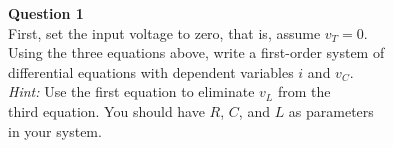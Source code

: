 \documentclass[preview]{standalone}
\begin{document}
\begin{center}
\raggedright
                    \textbf{Question 1} \\[10pt]
                    First, set the input voltage to zero, that is, assume $v_T = 0$. \\
                    Using the three equations above, write a first-order system of \\
                    differential equations with dependent variables $i$ and $v_C$. \\[5pt]
                    \textit{Hint:} Use the first equation to eliminate $v_L$ from the \\
                    third equation. You should have $R$, $C$, and $L$ as parameters \\
                    in your system.
\end{center}
\end{document}
